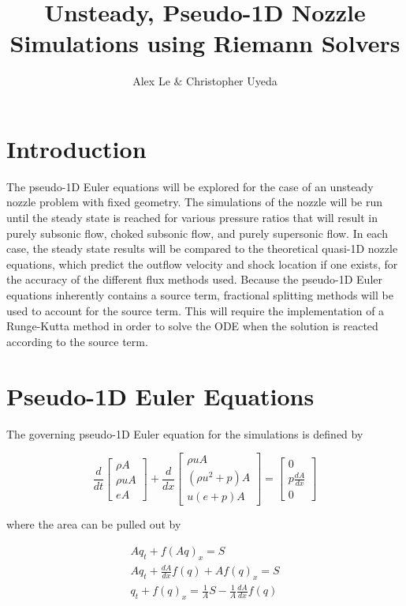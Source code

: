 \documentclass{article}%
\title{Unsteady, Pseudo-1D Nozzle Simulations using Riemann Solvers}
\author{Alex Le $\&$ Christopher Uyeda}
\numberwithin{equation}{section}
\begin{document}
\maketitle

\section{Introduction}
The pseudo-1D Euler equations will be explored for the case of an unsteady nozzle problem with fixed geometry. The simulations of the nozzle will be run until the steady state is reached for various pressure ratios that will result in purely subsonic flow, choked subsonic flow, and purely supersonic flow. In each case, the steady state results will be compared to the theoretical quasi-1D nozzle equations, which predict the outflow velocity and shock location if one exists, for the accuracy of the different flux methods used. Because the pseudo-1D Euler equations inherently contains a source term, fractional splitting methods will be used to account for the source term. This will require the implementation of a Runge-Kutta method in order to solve the ODE when the solution is reacted according to the source term.

\section{Pseudo-1D Euler Equations}
The governing pseudo-1D Euler equation for the simulations is defined by

\begin{equation}
\frac{d}{dt} \left[ \begin{array}{c} \rho A \\ \rho u A \\ e A \end{array} \right] + \frac{d}{dx} \left[ \begin{array}{c} \rho u A \\ (\rho u^2 + p) A \\ u(e + p)A \end{array} \right] = \left[ \begin{array}{c} 0 \\ p \frac{dA}{dx} \\ 0 \end{array} \right] \label{psuedoeuler}
\end{equation}

where the area can be pulled out by

\begin{equation*}
\begin{split}
A q_t + f(A q)_x = S \\
A q_t + \frac{dA}{dx} f(q) + A f(q)_x = S \\
q_t + f(q)_x = \frac{1}{A}S - \frac{1}{A} \frac{dA}{dx} f(q) \\
\end{split}
\end{equation*}
\end{document}
